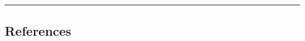 \onecolumn{}
\hrule
\subsection{References}
\begin{multicols*}{3}
\printbibliography[heading=none] %
\end{multicols*}%